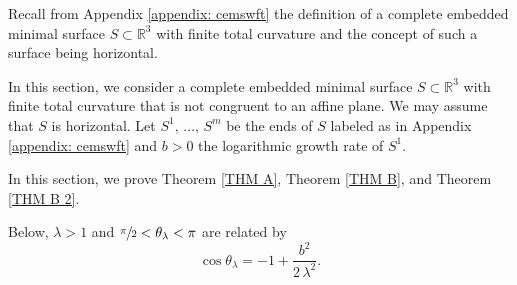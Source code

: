 \documentclass[11pt]{amsart}
\begin{document}
Recall from Appendix \ref{appendix: cemswft} the definition of a complete embedded minimal surface $S\subset \mathbb{R}^3$ with finite total curvature and the concept of such a surface being horizontal.

In this section, we consider a complete embedded minimal surface $S\subset \mathbb{R}^3$ with finite total curvature that is not congruent to an affine plane. We may assume that $S$ is horizontal.   Let $S^1,\,\ldots,\, S^m$ be the ends of $S$ labeled as in Appendix \ref{appendix: cemswft} and $b>0$ the logarithmic growth rate of $S^1$.

In this section, we prove Theorem \ref{THM A}, Theorem \ref{THM B}, and Theorem \ref{THM B 2}.

Below, $\lambda>1$ and $\sfrac{\pi}2<\theta_\lambda<\pi$ are related by 
$$
\cos\theta_\lambda=-1+\frac{b^2}{2\,\lambda^2}.
$$  
\end{document}
